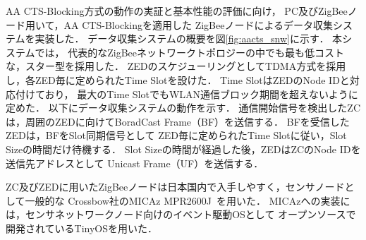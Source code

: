 \documentclass[technicalreport]{ieicej}
\begin{document}
AA CTS-Blocking方式の動作の実証と基本性能の評価に向け，
PC及びZigBeeノード用いて，AA CTS-Blockingを適用した
ZigBeeノードによるデータ収集システムを実装した．
データ収集システムの概要を図\ref{fig:aacts_snw}に示す．
本システムでは，
代表的なZigBeeネットワークトポロジーの中でも最も低コストな，スター型を採用した．
ZEDのスケジューリングとしてTDMA方式を採用し，各ZED毎に定められたTime Slotを設けた．
Time SlotはZEDのNode IDと対応付けており，
最大のTime SlotでもWLAN通信ブロック期間を超えないように定めた．
以下にデータ収集システムの動作を示す．
通信開始信号を検出したZCは，周囲のZEDに向けてBoradCast Frame（BF）を送信する．
BFを受信したZEDは，BFをSlot同期信号として
ZED毎に定められたTime Slotに従い，Slot Sizeの時間だけ待機する．
Slot Sizeの時間が経過した後，ZEDはZCのNode IDを送信先アドレスとして
Unicast Frame（UF）を送信する．

ZC及びZEDに用いたZigBeeノードは日本国内で入手しやすく，センサノードとして一般的な
Crossbow社のMICAz MPR2600J~\cite{Device:}を用いた．
MICAzへの実装には，センサネットワークノード向けのイベント駆動OSとして
オープンソースで開発されているTinyOSを用いた．
\end{document}
